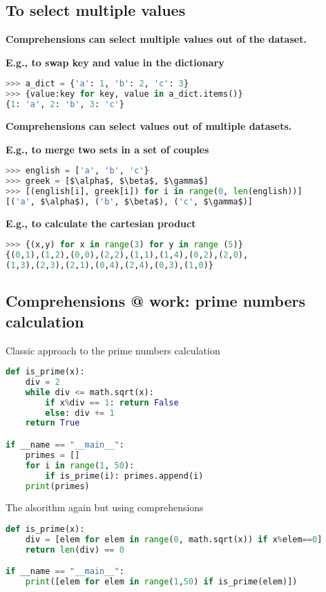 \subsection{To select multiple values}
\textbf{Comprehensions can select multiple values out of the dataset.}

\textbf{E.g., to swap key and value in the dictionary}
\begin{lstlisting}[language=Python]
>>> a_dict = {'a': 1, 'b': 2, 'c': 3}
>>> {value:key for key, value in a_dict.items()}
{1: 'a', 2: 'b', 3: 'c'}
\end{lstlisting}
\textbf{Comprehensions can select values out of multiple datasets.}

\textbf{E.g., to merge two sets in a set of couples}
\begin{lstlisting}[language=Python]
>>> english = ['a', 'b', 'c'}
>>> greek = [$\alpha$, $\beta$, $\gamma$]
>>> [(english[i], greek[i]) for i in range(0, len(english))]
[('a', $\alpha$), ('b', $\beta$), ('c', $\gamma$)]
\end{lstlisting}


\textbf{E.g., to calculate the cartesian product}
\begin{lstlisting}[language=Python]
>>> {(x,y) for x in range(3) for y in range (5)}
{(0,1),(1,2),(0,0),(2,2),(1,1),(1,4),(0,2),(2,0),
(1,3),(2,3),(2,1),(0,4),(2,4),(0,3),(1,0)}
\end{lstlisting}

\subsection{Comprehensions @ work: prime numbers calculation}
\item Classic approach to the prime numbers calculation
\begin{lstlisting}[language=Python]
def is_prime(x):
	div = 2
	while div <= math.sqrt(x):
		if x%div == 1: return False		
		else: div += 1
	return True

if __name == "__main__":
	primes = []
	for i in range(1, 50):
		if is_prime(i): primes.append(i)
	print(primes)
\end{lstlisting}
\item The alsorithm again but using comprehensions
\begin{lstlisting}[language=Python]
def is_prime(x):	
	div = [elem for elem in range(0, math.sqrt(x)) if x%elem==0]
	return len(div) == 0

if __name == "__main__":
	print([elem for elem in range(1,50) if is_prime(elem)])
\end{lstlisting}


